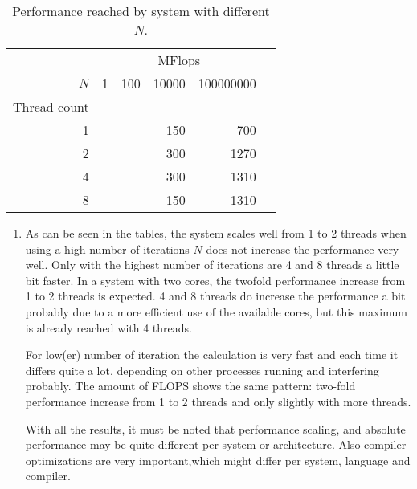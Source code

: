 \documentclass[a4paper]{article}
\begin{document}
	\begin{table}
		\centering
		\caption{Performance reached by system with different $N$.}
		\label{tbl:piflops}
		\begin{tabular}{r|r|r|r|r|r}
			& \multicolumn{4}{c}{MFlops } \\
			$N$ & 1 & 100 & 10000 & 100000000 \\ \hline
			Thread count \\ \cline{2-5}
		 1 &  &  & 150 & 700  \\
		 2 &  &  & 300 & 1270 \\
		 4 &  &  & 300 & 1310 \\
		 8 &  &  & 150 & 1310 \\
		\end{tabular}
	\end{table} 
		
\begin{enumerate}
\item As can be seen in the tables, the system scales well from 1 to 2 threads when using a high number of iterations $N$ does not increase the performance very well. Only with the highest number of iterations are 4 and 8 threads a little bit faster. In a system with two cores, the twofold performance increase from 1 to 2 threads is expected. 4 and 8 threads do increase the performance a bit probably due to a more efficient use of the available cores, but this maximum is already reached with 4 threads.

For low(er) number of iteration the calculation is very fast and each time it differs quite a lot, depending on other processes running and interfering probably. The amount of FLOPS shows the same pattern: two-fold performance increase from 1 to 2 threads and only slightly with more threads.

With all the results, it must be noted that performance scaling, and absolute performance may be quite different per system or architecture. Also compiler optimizations are very important,which might differ per system, language and compiler. 
\end{enumerate} 
\end{document}
